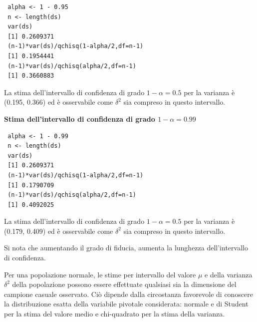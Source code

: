\begin{lstlisting}
 alpha <- 1 - 0.95
 n <- length(ds)
 var(ds)
 [1] 0.2609371
 (n-1)*var(ds)/qchisq(1-alpha/2,df=n-1)
 [1] 0.1954441
 (n-1)*var(ds)/qchisq(alpha/2,df=n-1)
 [1] 0.3660883
\end{lstlisting}

La stima dell'intervallo di confidenza di grado $1-\alpha = 0.5$ per la varianza è (0.195, 0.366) ed è osservabile come $\delta^2$ sia compreso in questo intervallo.

\vspace{5mm}
\noindent \textbf{Stima dell'intervallo di confidenza di grado $1 - \alpha = 0.99$}

\vspace{5mm}
\begin{lstlisting}
 alpha <- 1 - 0.99
 n <- length(ds)
 var(ds)
 [1] 0.2609371
 (n-1)*var(ds)/qchisq(1-alpha/2,df=n-1)
 [1] 0.1790709
 (n-1)*var(ds)/qchisq(alpha/2,df=n-1)
 [1] 0.4092025
\end{lstlisting}

La stima dell'intervallo di confidenza di grado $1-\alpha = 0.5$ per la varianza è (0.179, 0.409) ed è osservabile come $\delta^2$ sia compreso in questo intervallo.

Si nota che aumentando il grado di fiducia, aumenta la lunghezza dell'intervallo di confidenza.

Per una popolazione normale, le stime per intervallo del valore $\mu$ e della varianza $\delta^2$ della popolazione possono essere effettuate qualsiasi sia la dimensione del campione casuale osservato. Ciò dipende dalla circostanza favorevole di conoscere la distribuzione esatta della variabile pivotale considerata: normale e di Student per la stima del valore medio e chi-quadrato per la stima della varianza.

\newpage